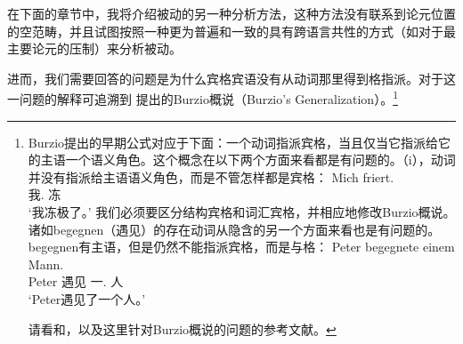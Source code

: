 在下面的章节中，我将介绍被动的另一种分析方法，这种方法没有联系到论元位置的空范畴，并且试图按照一种更为普遍和一致的具有跨语言共性的方式（如对于最主要论元的压制）来分析被动。

进而，我们需要回答的问题是为什么宾格宾语没有从动词那里得到格指派。对于这一问题的解释可追溯到\citet[--185]{Burzio86a-u-gekauft} 提出的Burzio概说（Burzio's Generalization）。\footnote{
Burzio提出的早期公式对应于下面：一个动词指派宾格，当且仅当它指派给它的主语一个语义角色。这个概念在以下两个方面来看都是有问题的。（i），动词并没有指派给主语语义角色，而是不管怎样都是宾格：
\ea
\gll Mich friert.\\
	 我.\acc{} 冻\\
\glt `我冻极了。'
\z
我们必须要区分结构宾格和词汇宾格，并相应地修改Burzio概说。诸如begegnen（遇见）的存在动词从隐含的另一个方面来看也是有问题的。begegnen有主语，但是仍然不能指派宾格，而是与格：
\ea
\gll Peter begegnete einem Mann.\\
     Peter 遇见 一.\dat{} 人\\
\glt `Peter遇见了一个人。'
\z

请看和，以及这里针对Burzio概说的问题的参考文献。
}
